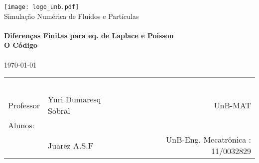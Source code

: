 \begin{titlepage}
\begin{center}

\texttt{[image: logo\_unb.pdf]}~\\[1cm]

\Huge Simulação Numérica de  Fluídos e Partículas\\[0.5cm]

\HRule \\[0.4cm]
{ \huge \bfseries  Diferenças Finitas para eq. de Laplace e Poisson \\ O Código}\\[0.4cm]

\HRule \\[0.5cm]

{\large \today}


\vfill %



	\begin{center} \large
		\begin{tabular}{llr} \
		& & \\[0.05cm]		
		Professor & Yuri Dumaresq Sobral & UnB-MAT\\
		
		Alunos:& & \\
		& Juarez A.S.F 					& UnB-Eng. Mecatrônica : 11/0032829\\	
		\end{tabular}

	
	\end{center}


\end{center}
\end{titlepage}